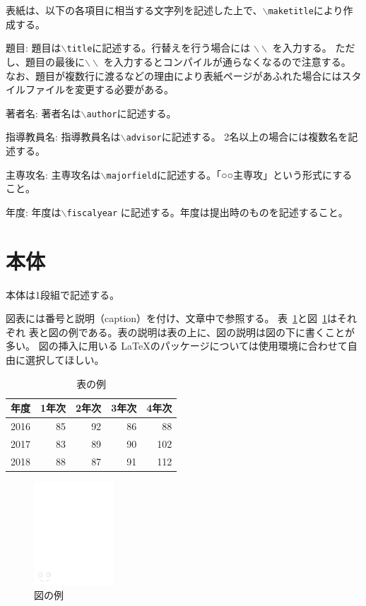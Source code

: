 \documentclass[a4paper,11pt]{jreport}
\begin{document}
表紙は、以下の各項目に相当する文字列を記述した上で、\texttt{$\backslash$maketitle}により作成する。

\begin{description} \parskip=1pt
\item{題目: }
題目は\texttt{$\backslash$title}に記述する。行替えを行う場合には $\backslash \backslash$ を入力する。
ただし、題目の最後に$\backslash \backslash$ を入力するとコンパイルが通らなくなるので注意する。
なお、題目が複数行に渡るなどの理由により表紙ページがあふれた場合にはスタイルファイルを変更する必要がある。
\item{著者名: }
著者名は\texttt{$\backslash$author}に記述する。
\item{指導教員名: }
指導教員名は\texttt{$\backslash$advisor}に記述する。
2名以上の場合には複数名を記述する。
\item{主専攻名: }
主専攻名は\texttt{$\backslash$majorfield}に記述する。「○○主専攻」という形式にすること。
\item{年度: }
年度は\texttt{$\backslash$fiscalyear} に記述する。年度は提出時のものを記述すること。
\end{description}

\section{本体}

本体は1段組で記述する。

図表には番号と説明（caption）を付け、文章中で参照する。
表~\ref{table:scores}と図~\ref{figure:smile}はそれぞれ
表と図の例である。表の説明は表の上に、図の説明は図の下に書くことが多い。
図の挿入に用いる \LaTeX のパッケージについては使用環境に合わせて自由に選択してほしい。

\begin{table}[hbt]
\caption{表の例}
\label{table:scores}
\begin{center}
\begin{tabular}{|c|r|r|r|r|}
\hline
年度 & 1年次 & 2年次 & 3年次 & 4年次 \\
\hline
2016 & 85 & 92 & 86 &  88 \\
2017 & 83 & 89 & 90 & 102 \\
2018 & 88 & 87 & 91 & 112 \\
\hline 
\end{tabular}
\end{center}
\end{table}
\medskip

\begin{figure}[htbp]
\begin{center}
\includegraphics[width=3cm]{smile.pdf}
\end{center}
\caption{図の例}
\label{figure:smile}
\end{figure}
\end{document}
